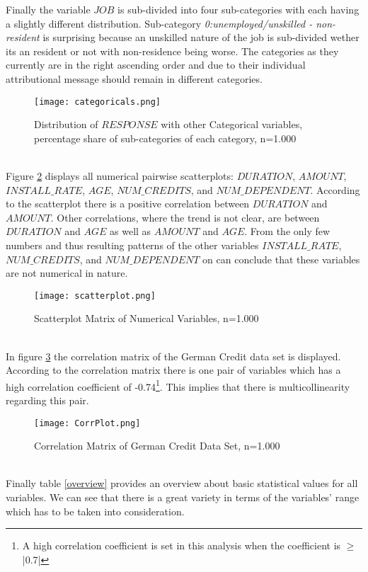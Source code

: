 Finally the variable $JOB$ is sub-divided into four sub-categories with each having a slightly different distribution. Sub-category \textit{0:unemployed/unskilled - non-resident} is surprising because an unskilled nature of the job is sub-divided wether its an resident or not with non-residence being worse. The categories as they currently are in the right ascending order and due to their individual attributional message should remain in different categories. 
\begin{figure}[htbp]
	\centering
	\texttt{[image: categoricals.png]}
	\caption{Distribution of $RESPONSE$ with other Categorical variables, percentage share of sub-categories of each category, n=1.000}
	\label{categoricals}
\end{figure}\\
Figure \ref{scatterplot} displays all numerical pairwise scatterplots: $DURATION$, $AMOUNT$, $INSTALL\_RATE$, $AGE$, $NUM\_CREDITS$, and $NUM\_DEPENDENT$. According to the scatterplot there is a positive correlation between $DURATION$ and $AMOUNT$. Other correlations, where the trend is not clear, are between $DURATION$ and $AGE$ as well as $AMOUNT$ and $AGE$. From the only few numbers and thus resulting patterns of the other variables $INSTALL\_RATE$, $NUM\_CREDITS$, and $NUM\_DEPENDENT$ on can conclude that these variables are not numerical in nature. %
\begin{figure}[htbp!]
	\centering
	\texttt{[image: scatterplot.png]}
	\caption{Scatterplot Matrix of Numerical Variables, n=1.000}
	\label{scatterplot}
\end{figure}\\
In figure \ref{corrMatrix} the correlation matrix of the German Credit data set is displayed. According to the correlation matrix there is one pair of variables which has a high correlation coefficient of -0.74\footnote{A high correlation coefficient is set in this analysis when the coefficient is $\geq$ |0.7|}. This implies that there is multicollinearity regarding this pair.
\begin{figure}[htbp]
	\centering
	\texttt{[image: CorrPlot.png]}
	\caption{Correlation Matrix of German Credit Data Set, n=1.000}
	\label{corrMatrix}
\end{figure}\\
Finally table \ref{overview} provides an overview about basic statistical values for all variables. We can see that there is a great variety in terms of the variables' range which has to be taken into consideration. %
